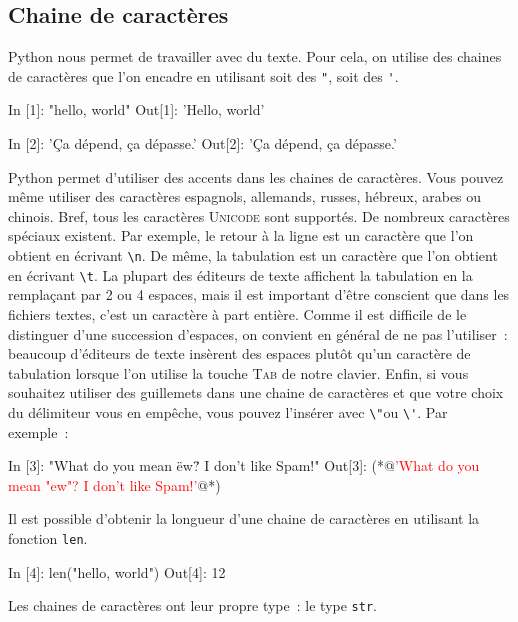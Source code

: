 \documentclass{magnoliaold}
\begin{document}
\subsection{Chaine de caractères}

Python nous permet de travailler avec du texte. Pour cela, on utilise des chaines de caractères que l'on
encadre en utilisant soit des \og\verb_"_\fg, soit des \og\verb_'_\fg.

\begin{pythoncode}
In [1]: "hello, world"
Out[1]: 'Hello, world'

In [2]: 'Ça dépend, ça dépasse.'
Out[2]: 'Ça dépend, ça dépasse.'
\end{pythoncode}

\noindent Python permet d'utiliser des accents dans les chaines de caractères.
Vous pouvez même utiliser des caractères espagnols, allemands, russes, hébreux, arabes
ou chinois. Bref, tous les caractères \textsc{Unicode} sont supportés.
De nombreux caractères \og spéciaux \fg existent. Par exemple, le retour à la ligne est un
\og caractère \fg que l'on obtient en écrivant \og\verb_\n_\fg. De même, la tabulation est
un caractère que l'on obtient en écrivant \og\verb_\t_\fg. La plupart des éditeurs de texte
affichent la tabulation en la remplaçant par 2 ou 4 espaces,
mais il est important d'être conscient que dans les fichiers textes, c'est un caractère à part entière. Comme il
est difficile de le distinguer d'une succession d'espaces, on convient
en général de ne pas l'utiliser~: beaucoup d'éditeurs de texte insèrent des espaces
plutôt qu'un caractère de tabulation lorsque l'on utilise la touche \og \textsc{Tab} \fg de notre clavier. Enfin, si
vous souhaitez utiliser des guillemets dans une chaine de caractères et que votre
choix du délimiteur vous en empêche, vous pouvez l'insérer avec \og\verb_\"_\fg ou
\og\verb_\'_\fg. Par exemple~:

\begin{pythoncode}
In [3]: "What do you mean \"ew\"? I don't like Spam!"
Out[3]: (*@\textcolor{red}{'What do you mean "ew"? I don't like Spam!'}@*)
\end{pythoncode}
Il est possible d'obtenir la longueur d'une chaine de caractères en utilisant la
fonction \verb_len_.

\begin{pythoncode}
In [4]: len("hello, world")
Out[4]: 12
\end{pythoncode}

Les chaines de caractères ont leur propre type~: le type \verb_str_.
\end{document}
